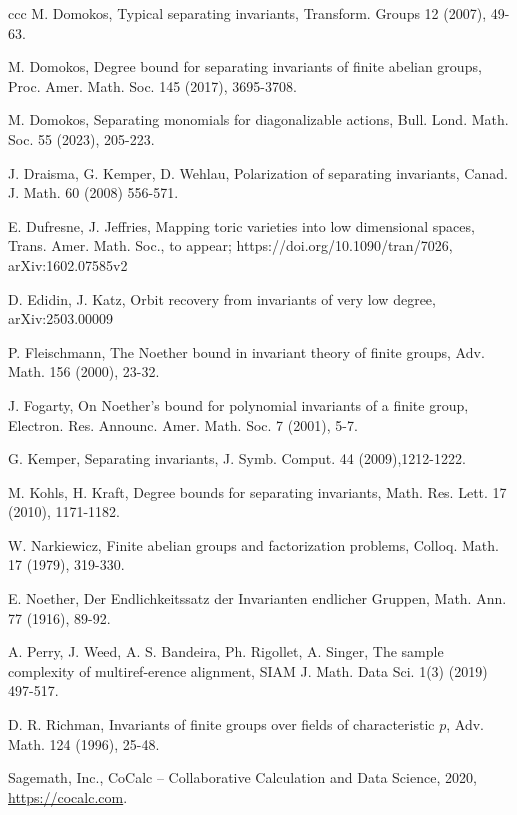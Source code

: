 \documentclass[12pt, oneside]{amsart}
\begin{document}
\begin{thebibliography}{ccc}
 M. Domokos, Typical separating invariants, 
Transform. Groups 12 (2007), 49-63. 

 M. Domokos, 
Degree bound for separating invariants of finite abelian groups, 
Proc. Amer. Math. Soc. 145 (2017), 3695-3708. 

 M. Domokos, Separating monomials for diagonalizable actions, 
 Bull. Lond. Math. Soc. 55 (2023), 205-223. 



 J. Draisma, G. Kemper, D. Wehlau, 
Polarization of separating invariants, Canad. J. Math. 60 (2008) 556-571.


 E. Dufresne, J. Jeffries, 
Mapping toric varieties into low dimensional spaces, 
Trans. Amer. Math. Soc.,  to appear; 
https://doi.org/10.1090/tran/7026, arXiv:1602.07585v2


 D. Edidin, J. Katz, Orbit recovery from invariants of very low degree, 
arXiv:2503.00009

 P. Fleischmann, The Noether bound in invariant theory of finite groups, Adv. Math. 156 (2000), 23-32. 

 J. Fogarty, On Noether's bound for polynomial invariants of a finite group, Electron. Res. Announc. Amer. Math. Soc. 7 (2001), 5-7. 



 G. Kemper, Separating invariants, 
J. Symb. Comput. 44 (2009),1212-1222. 

 M. Kohls, H. Kraft, Degree bounds for separating invariants, 
Math. Res. Lett. 17 (2010), 1171-1182. 

 W. Narkiewicz, Finite abelian groups and factorization problems, 
Colloq. Math. 17 (1979), 319-330.


 E. Noether, Der Endlichkeitssatz der Invarianten endlicher Gruppen, 
Math. Ann. 77 (1916), 89-92. 


 A. Perry, J. Weed, A. S. Bandeira, Ph. Rigollet, A. Singer, 
The sample complexity of multiref-erence alignment, SIAM J. Math. Data Sci. 1(3) (2019) 497-517.

D. R. Richman, 
Invariants of finite groups over fields of characteristic $p$, 
Adv. Math. 124 (1996), 25-48.


 Sagemath, Inc.,
  CoCalc – Collaborative Calculation and Data Science, 
  2020, \url{https://cocalc.com}. 


\end{thebibliography}
\end{document}

